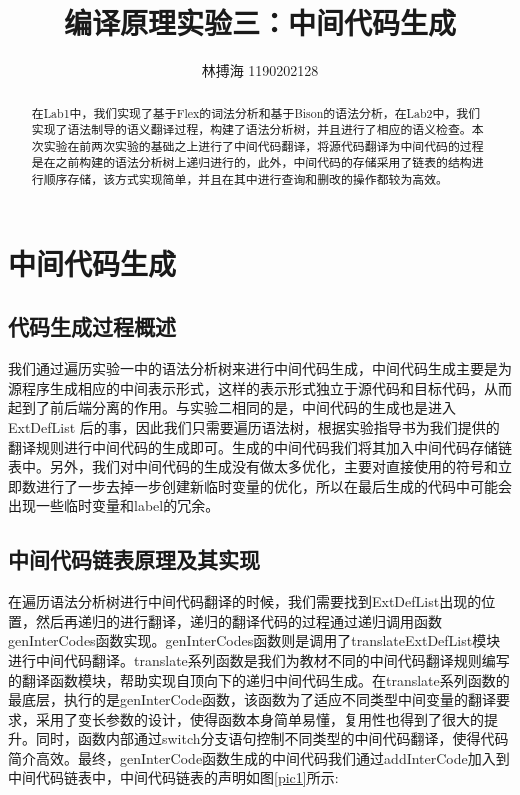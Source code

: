 \documentclass[lang=cn,11pt,a4paper,cite=authoryear]{elegantpaper}
\title{编译原理实验三：中间代码生成}
\author{林搏海 1190202128}
\institute{{哈尔滨工业大学} {物联网工程}}
\date{\zhtoday}
\begin{document}
\maketitle

\begin{abstract}
\hspace*{0.7cm}在Lab1中，我们实现了基于Flex的词法分析和基于Bison的语法分析，在Lab2中，我们实现了语法制导的语义翻译过程，构建了语法分析树，并且进行了相应的语义检查。本次实验在前两次实验的基础之上进行了中间代码翻译，将源代码翻译为中间代码的过程是在之前构建的语法分析树上递归进行的，此外，中间代码的存储采用了链表的结构进行顺序存储，该方式实现简单，并且在其中进行查询和删改的操作都较为高效。
\end{abstract}



\section{中间代码生成}
\subsection{代码生成过程概述}
我们通过遍历实验一中的语法分析树来进行中间代码生成，中间代码生成主要是为源程序生成相应的中间表示形式，这样的表示形式独立于源代码和目标代码，从而起到了前后端分离的作用。与实验二相同的是，中间代码的生成也是进入 ExtDefList 后的事，因此我们只需要遍历语法树，根据实验指导书为我们提供的翻译规则进行中间代码的生成即可。生成的中间代码我们将其加入中间代码存储链表中。另外，我们对中间代码的生成没有做太多优化，主要对直接使用的符号和立即数进行了一步去掉一步创建新临时变量的优化，所以在最后生成的代码中可能会出现一些临时变量和label的冗余。

\subsection{中间代码链表原理及其实现}
在遍历语法分析树进行中间代码翻译的时候，我们需要找到ExtDefList出现的位置，然后再递归的进行翻译，递归的翻译代码的过程通过递归调用函数genInterCodes函数实现。genInterCodes函数则是调用了translateExtDefList模块进行中间代码翻译。translate系列函数是我们为教材不同的中间代码翻译规则编写的翻译函数模块，帮助实现自顶向下的递归中间代码生成。在translate系列函数的最底层，执行的是genInterCode函数，该函数为了适应不同类型中间变量的翻译要求，采用了变长参数的设计，使得函数本身简单易懂，复用性也得到了很大的提升。同时，函数内部通过switch分支语句控制不同类型的中间代码翻译，使得代码简介高效。最终，genInterCode函数生成的中间代码我们通过addInterCode加入到中间代码链表中，中间代码链表的声明如图\ref{pic1}所示:\par
\end{document}
